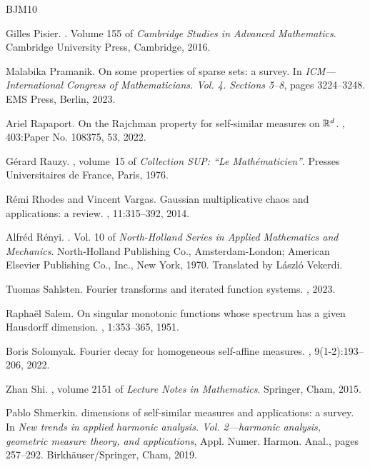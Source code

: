 \documentclass[12pt]{amsart}
\theoremstyle{definition}
\theoremstyle{remark}
\numberwithin{equation}{section}
\begin{document}
\begin{thebibliography}{BJM10}
	
	Gilles Pisier.
	. Volume 155 of {\em Cambridge
		Studies in Advanced Mathematics}.
	\newblock Cambridge University Press, Cambridge, 2016.
	
	Malabika Pramanik.
	\newblock On some properties of sparse sets: a survey.
	\newblock In {\em I{CM}---{I}nternational {C}ongress of {M}athematicians.
		{V}ol. 4. {S}ections 5--8}, pages 3224--3248. EMS Press, Berlin,  2023.
	
	
	
	
	
	Ariel Rapaport.
	\newblock On the {R}ajchman property for self-similar measures on {$\Bbb R^d$}.
	, 403:Paper No. 108375, 53, 2022.
	
	G\'{e}rard Rauzy.
	,
	volume~15 of {\em Collection SUP: ``Le Math\'{e}maticien''}.
	\newblock Presses Universitaires de France, Paris, 1976.
	
	R\'{e}mi Rhodes and Vincent Vargas.
	\newblock Gaussian multiplicative chaos and applications: a review.
	, 11:315--392, 2014.
	
	Alfr\'ed R\'{e}nyi.
	. Vol. 10 of {\em North-Holland Series
		in Applied Mathematics and Mechanics}.
	\newblock North-Holland Publishing Co., Amsterdam-London; American Elsevier
	Publishing Co., Inc., New York, 1970.
	\newblock Translated by L\'{a}szl\'{o} Vekerdi.
	
	Tuomas Sahlsten. 
	\newblock Fourier transforms and iterated function systems.
	, 2023.
	
	Raphaël Salem.
	\newblock On singular monotonic functions whose spectrum has a given
	{H}ausdorff dimension.
	, 1:353--365, 1951.
	
	Boris Solomyak.
	\newblock Fourier decay for homogeneous self-affine measures.
	, 9(1-2):193--206, 2022.
	
	Zhan Shi.
	, volume 2151 of {\em Lecture Notes in
		Mathematics}.
	\newblock Springer, Cham, 2015.
	
	
	Pablo Shmerkin.
	 dimensions of self-similar measures and applications: a
	survey.
	\newblock In {\em New trends in applied harmonic analysis. {V}ol. 2---harmonic
		analysis, geometric measure theory, and applications}, Appl. Numer. Harmon.
	Anal., pages 257--292. Birkh\"{a}user/Springer, Cham, 2019.
	

\end{thebibliography}
\end{document}
